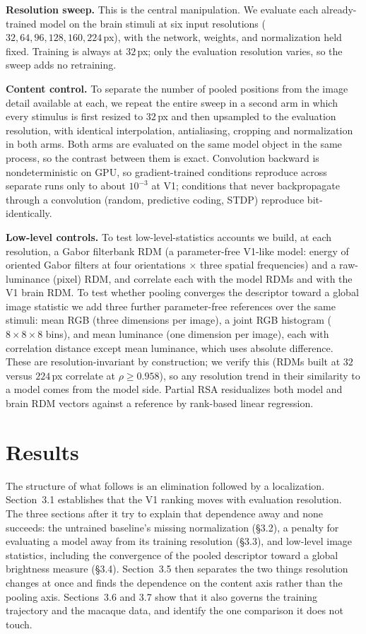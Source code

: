 \documentclass[10pt,twocolumn]{article}
\begin{document}
\textbf{Resolution sweep.} This is the central manipulation. We evaluate each already-trained model on the brain stimuli at six input resolutions ($32, 64, 96, 128, 160, 224$\,px), with the network, weights, and normalization held fixed. Training is always at $32$\,px; only the evaluation resolution varies, so the sweep adds no retraining.

\textbf{Content control.} To separate the number of pooled positions from the image detail available at each, we repeat the entire sweep in a second arm in which every stimulus is first resized to $32$\,px and then upsampled to the evaluation resolution, with identical interpolation, antialiasing, cropping and normalization in both arms. Both arms are evaluated on the same model object in the same process, so the contrast between them is exact. Convolution backward is nondeterministic on GPU, so gradient-trained conditions reproduce across separate runs only to about $10^{-3}$ at V1; conditions that never backpropagate through a convolution (random, predictive coding, STDP) reproduce bit-identically.

\textbf{Low-level controls.} To test low-level-statistics accounts we build, at each resolution, a Gabor filterbank RDM (a parameter-free V1-like model: energy of oriented Gabor filters at four orientations $\times$ three spatial frequencies) and a raw-luminance (pixel) RDM, and correlate each with the model RDMs and with the V1 brain RDM. To test whether pooling converges the descriptor toward a global image statistic we add three further parameter-free references over the same stimuli: mean RGB (three dimensions per image), a joint RGB histogram ($8\times8\times8$ bins), and mean luminance (one dimension per image), each with correlation distance except mean luminance, which uses absolute difference. These are resolution-invariant by construction; we verify this (RDMs built at $32$ versus $224$\,px correlate at $\rho \geq 0.958$), so any resolution trend in their similarity to a model comes from the model side. Partial RSA residualizes both model and brain RDM vectors against a reference by rank-based linear regression.

\section{Results}

The structure of what follows is an elimination followed by a localization. Section~3.1 establishes that the V1 ranking moves with evaluation resolution. The three sections after it try to explain that dependence away and none succeeds: the untrained baseline's missing normalization (\S3.2), a penalty for evaluating a model away from its training resolution (\S3.3), and low-level image statistics, including the convergence of the pooled descriptor toward a global brightness measure (\S3.4). Section~3.5 then separates the two things resolution changes at once and finds the dependence on the content axis rather than the pooling axis. Sections~3.6 and 3.7 show that it also governs the training trajectory and the macaque data, and identify the one comparison it does not touch.
\end{document}
